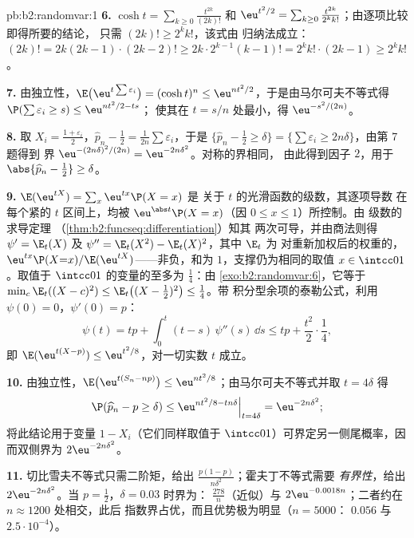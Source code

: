 \begin{solution}{pb:b2:randomvar:1}
\textbf{6.} $\cosh t = \sum_{k\geq0}\frac{t^{2k}}{(2k)!}$ 和
$\eu^{t^2/2} = \sum_{k\geq0}\frac{t^{2k}}{2^kk!}$；由逐项比较即得所要的结论，
只需 $(2k)! \geq 2^kk!$，该式由
归纳法成立：$(2k)! = 2k(2k-1)\cdot(2k-2)! \geq 2k\cdot
2^{k-1}(k-1)! = 2^kk!\cdot(2k-1) \geq 2^kk!$。

\textbf{7.} 由独立性，$\E\bigl(\eu^{t\sum\varepsilon_i}
\bigr) = (\cosh t)^n \leq \eu^{nt^2/2}$，于是由马尔可夫不等式得
$\P(\sum\varepsilon_i \geq s) \leq \eu^{nt^2/2 - ts}$；
使其在 $t = s/n$ 处最小，得 $\eu^{-s^2/(2n)}$。

\textbf{8.} 取 $X_i = \frac{1 + \varepsilon_i}2$，$\widehat
p_n - \frac12 = \frac1{2n}\sum\varepsilon_i$，于是
$\{\widehat p_n - \frac12 \geq \delta\} =
\{\sum\varepsilon_i \geq 2n\delta\}$，由第 7 题得到
界 $\eu^{-(2n\delta)^2/(2n)} = \eu^{-2n\delta^2}$。对称的界相同，
由此得到因子 $2$，用于
$\abs{\widehat p_n - \frac12} \geq \delta$。

\textbf{9.} $\E(\eu^{tX}) = \sum_x\eu^{tx}\P(X = x)$ 是
关于 $t$ 的光滑函数的级数，其逐项导数
在每个紧的 $t$ 区间上，均被
$\eu^{\abs t}\P(X = x)$（因 $0 \leq x \leq 1$）所控制。由
级数的求导定理
（\cref{thm:b2:funcseq:differentiation}）知其
两次可导，并由商法则得 $\psi' = \E_t(X)$
及 $\psi'' = \E_t(X^2) - \E_t(X)^2$，其中 $\E_t$ 为
对重新加权后的权重的，
$\eu^{tx}\P(X{=}x)/\E(\eu^{tX})$——非负，和为
$1$，支撑仍为相同的取值 $x \in \intcc01$。取值于
$\intcc01$ 的变量的至多为 $\frac14$：由
\cref{exo:b2:randomvar:6}，它等于 $\min_c\E_t((X - c)^2) \leq
\E_t\bigl((X - \tfrac12)^2\bigr) \leq \tfrac14$。带
积分型余项的泰勒公式，利用 $\psi(0) = 0$，$\psi'(0) = p$：
\[
\psi(t) = tp + \int_0^t(t - s)\,\psi''(s)\,\dd s
\leq tp + \frac{t^2}2\cdot\frac14,
\]
即 $\E(\eu^{t(X - p)}) \leq \eu^{t^2/8}$，对一切实数 $t$ 成立。

\textbf{10.} 由独立性，$\E\bigl(\eu^{t(S_n -
np)}\bigr) \leq \eu^{nt^2/8}$；由马尔可夫不等式并取 $t
= 4\delta$ 得
\[
\P(\widehat p_n - p \geq \delta)
\leq \eu^{nt^2/8 - tn\delta}\Big|_{t = 4\delta}
= \eu^{-2n\delta^2};
\]
将此结论用于变量 $1 - X_i$（它们同样取值于
$\intcc01$）可界定另一侧尾概率，因而双侧界为
$2\eu^{-2n\delta^2}$。

\textbf{11.} 切比雪夫不等式只需二阶矩，给出
$\frac{p(1-p)}{n\delta^2}$；霍夫丁不等式需要
\emph{有界性}，给出 $2\eu^{-2n\delta^2}$。当 $p =
\frac12$，$\delta = 0.03$ 时界为：
$\frac{278}{n}$（近似）与
$2\eu^{-0.0018n}$；二者约在 $n \approx 1200$ 处相交，此后
指数界占优，而且优势极为明显（$n = 5000$：
$0.056$ 与 $2.5\cdot10^{-4}$）。


\end{solution}
